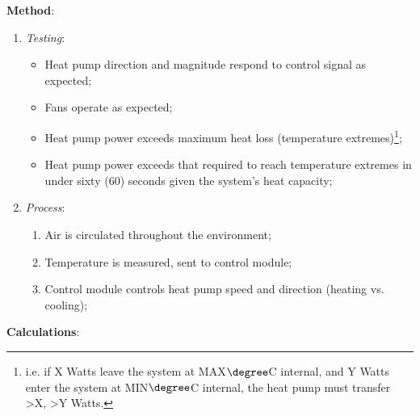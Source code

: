 \documentclass{../tex/report}
\begin{document}
\textbf{Method}:
\begin{enumerate}
    \item \textit{Testing}:
    \begin{itemize}
        \item Heat pump direction and magnitude respond to control signal as expected;
        \item Fans operate as expected;
        \item Heat pump power exceeds maximum heat loss (temperature extremes)\footnote{i.e. if X Watts leave the system at MAX$\degree$C internal, and Y Watts enter the system at MIN$\degree$C internal, the heat pump must transfer >X, >Y Watts.};
        \item Heat pump power exceeds that required to reach temperature extremes in under sixty (60) seconds given the system's heat capacity;
    \end{itemize}
    \item \textit{Process}:
    \begin{enumerate}
        \item Air is circulated throughout the environment;
        \item Temperature is measured, sent to control module;
        \item Control module controls heat pump speed and direction (heating vs. cooling);
    \end{enumerate}
\end{enumerate}

\textbf{Calculations}:
\end{document}
